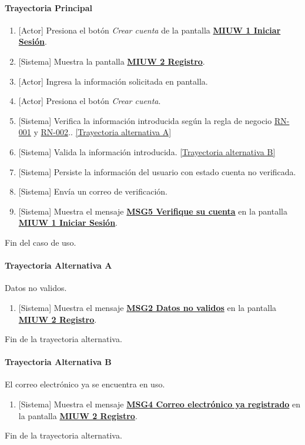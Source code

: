 \paragraph{Trayectoria Principal}
	\begin{enumerate}
	    \item {[Actor]} Presiona el botón \textit{Crear cuenta} de la pantalla \hyperref[fig:MIUW-1]{\bf MIUW 1 Iniciar Sesión}.
	    \item {[Sistema]} Muestra la pantalla \hyperref[fig:MIUW-2]{\bf MIUW 2 Registro}.
	    \item {[Actor]} Ingresa la información solicitada en pantalla.
	    \item {[Actor]} Presiona el botón \textit{Crear cuenta}.
	    \item {[Sistema]} Verifica la información introducida según la regla de negocio \hyperref[RN001]{RN-001} y \hyperref[RN002]{RN-002}.. \hyperref[W-USR-CU1:TA]{[Trayectoria alternativa A]}
	    \item {[Sistema]} Valida la información introducida. \hyperref[W-USR-CU1:TB]{[Trayectoria alternativa B]}
	    \item {[Sistema]} Persiste la información del usuario con estado cuenta no verificada.
	    \item {[Sistema]} Envía un correo de verificación.
	    \item {[Sistema]} Muestra el mensaje \hyperref[MSG5]{\bf MSG5 Verifique su cuenta} en la pantalla \hyperref[fig:MIUW-1]{\bf MIUW 1 Iniciar Sesión}.
	\end{enumerate}
	Fin del caso de uso.

\paragraph{Trayectoria Alternativa A} \label{W-USR-CU1:TA}
	Datos no validos.
	\begin{enumerate}[label=A\arabic*.]
		\item {[Sistema]} Muestra el mensaje \hyperref[MSG2]{\bf MSG2 Datos no validos} en la pantalla \hyperref[fig:MIUW-2]{\bf MIUW 2 Registro}.
	\end{enumerate}
	Fin de la trayectoria alternativa.
\paragraph{Trayectoria Alternativa B} \label{W-USR-CU1:TB}
    El correo electrónico ya se encuentra en uso.
	\begin{enumerate}[label=B\arabic*.]
		\item {[Sistema]} Muestra el mensaje \hyperref[MSG4]{\bf MSG4 Correo electrónico ya registrado} en la pantalla \hyperref[fig:MIUW-2]{\bf MIUW 2 Registro}.
	\end{enumerate}
	Fin de la trayectoria alternativa.